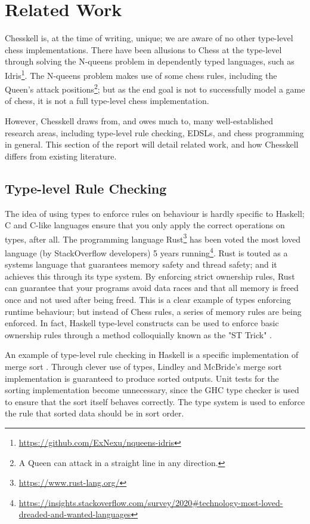 \documentclass[12pt, a4paper, bibliography=totocnumbered]{scrreprt}
\begin{document}
\section{Related Work}

Chesskell is, at the time of writing, unique; we are aware of no other type-level chess implementations. There have been allusions to Chess at the type-level through solving the N-queens problem in dependently typed languages, such as Idris\footnote{\url{https://github.com/ExNexu/nqueens-idris}}. The N-queens problem makes use of some chess rules, including the Queen's attack positions\footnote{A Queen can attack in a straight line in any direction.}; but as the end goal is not to successfully model a game of chess, it is not a full type-level chess implementation.

However, Chesskell draws from, and owes much to, many well-established research areas, including type-level rule checking, EDSLs, and chess programming in general. This section of the report will detail related work, and how Chesskell differs from existing literature.

\subsection{Type-level Rule Checking}

The idea of using types to enforce rules on behaviour is hardly specific to Haskell; C and C-like languages ensure that you only apply the correct operations on types, after all. The programming language Rust\footnote{\url{https://www.rust-lang.org/}} has been voted the most loved language (by StackOverflow developers) 5 years running\footnote{\url{https://insights.stackoverflow.com/survey/2020\#technology-most-loved-dreaded-and-wanted-languages}}. Rust is touted as a systems language that guarantees memory safety and thread safety; and it achieves this through its type system. By enforcing strict ownership rules, Rust can guarantee that your programs avoid data races and that all memory is freed once and not used after being freed. This is a clear example of types enforcing runtime behaviour; but instead of Chess rules, a series of memory rules are being enforced. In fact, Haskell type-level constructs can be used to enforce basic ownership rules through a method colloquially known as the "ST Trick" \cite{twt}.

An example of type-level rule checking in Haskell is a specific implementation of merge sort \cite{hasochism}. Through clever use of types, Lindley and McBride's merge sort implementation is guaranteed to produce sorted outputs. Unit tests for the sorting implementation become unnecessary, since the GHC type checker is used to ensure that the sort itself behaves correctly. The type system is used to enforce the rule that sorted data should be in sort order.
\end{document}
